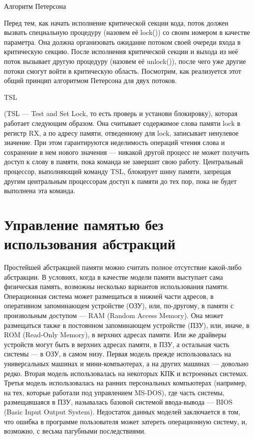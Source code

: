 \documentclass[a4paper,12pt]{extarticle}
\begin{document}
Алгоритм Петерсона

Перед тем, как начать исполнение критической секции кода, поток должен вызвать специальную процедуру (назовем её lock()) со своим номером в качестве параметра. Она должна организовать ожидание потоком своей очереди входа в критическую секцию. После исполнения критической секции и выхода из неё поток вызывает другую процедуру (назовем её unlock()), после чего уже другие потоки смогут войти в критическую область. Посмотрим, как реализуется этот общий принцип алгоритмом Петерсона для двух потоков. 

TSL

(TSL — Test and Set Lock, то есть проверь и установи блокировку), которая работает следующим образом. Она считывает содержимое слова памяти lock в регистр RX, а по адресу памяти, отведенному для lock, записывает ненулевое значение. При этом гарантируются неделимость операций чтения слова и сохранение в нем нового значения — никакой другой процесс не может получить доступ к слову в памяти, пока команда не завершит свою работу. Центральный процессор, выполняющий команду TSL, блокирует шину памяти, запрещая другим центральным процессорам доступ к памяти до тех пор, пока не будет выполнена эта команда.

\section{Управление памятью без использования абстракций}
Простейшей абстракцией памяти можно считать полное отсутствие какой-либо абстракции. В условиях, когда в качестве модели памяти выступает сама физическая память, возможны несколько вариантов использования памяти. Операционная система может размещаться в нижней части адресов, в оперативном запоминающем устройстве (ОЗУ), или, по-другому, в памяти с произвольным доступом — RAM (Random Access Memory). Она может размещаться также в постоянном запоминающем устройстве (ПЗУ), или, иначе, в ROM (Read-Only Memory), в верхних адресах памяти. Или же драйверы устройств могут быть в верхних адресах памяти, в ПЗУ, а остальная часть системы — в ОЗУ, в самом низу. Первая модель прежде использовалась на универсальных машинах и мини-компьютерах, а на других машинах — довольно редко. Вторая модель использовалась на некоторых КПК и встроенных системах. Третья модель использовалась на ранних персональных компьютерах (например, на тех, которые работали под управлением MS-DOS), где часть системы, размещавшаяся в ПЗУ, называлась базовой системой ввода-вывода — BIOS (Basic Input Output System). Недостаток данных моделей заключается в том, что ошибка в программе пользователя может затереть операционную систему, и, возможно, с весьма пагубными последствиями.
\end{document}
